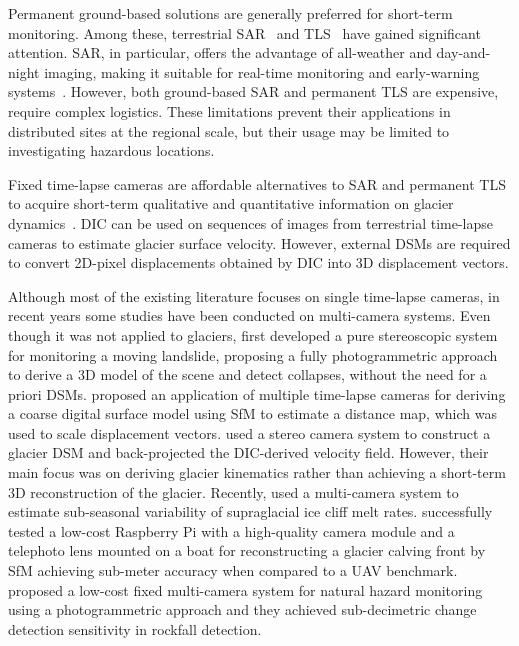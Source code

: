 Permanent ground-based solutions are generally preferred for short-term monitoring.
Among these, terrestrial SAR~\citep{Strozzi2020} and TLS~\citep{Hendrickx2022,Voordendag2023} have gained significant attention.
SAR, in particular, offers the advantage of all-weather and day-and-night imaging, making it suitable for real-time monitoring and early-warning systems~\citep{Dematteis2021, Noferini2009}.
However, both ground-based SAR and permanent TLS are expensive, require complex
logistics.
These limitations prevent their applications in distributed sites at the regional scale, but their usage may be limited to investigating hazardous locations.

Fixed time-lapse cameras are affordable alternatives to SAR and permanent TLS to acquire short-term qualitative and quantitative information on glacier dynamics~\citep{Giordan2016, James2016, Maas2006, Messerli2015}.
DIC can be used on sequences of images from terrestrial time-lapse cameras to estimate glacier surface velocity.
However, external DSMs are required to convert 2D-pixel displacements obtained by DIC into 3D displacement vectors.

Although most of the existing literature focuses on single time-lapse cameras, in recent
years some studies have been conducted on multi-camera systems.
Even though it was not applied to glaciers, \citet{roncella_landslide_2014} first
developed a pure stereoscopic system for monitoring a moving landslide, proposing a fully photogrammetric approach to derive a 3D model of the scene and detect collapses, without the need for a priori DSMs.
\citet{Schwalbe2017} proposed an application of multiple time-lapse cameras for deriving
a coarse digital surface model using SfM to estimate a distance
map, which was used to scale displacement vectors.
\citet{Marsy2020} used a stereo camera system to construct a glacier DSM and
back-projected the DIC-derived velocity field.
However, their main focus was on deriving glacier kinematics rather than achieving a
short-term 3D reconstruction of the glacier.
Recently, \citet{kneib_sub-seasonal_2022} used a multi-camera system to
estimate sub-seasonal variability of supraglacial ice cliff melt rates.
\citet{Taylor2023} successfully tested a low-cost Raspberry Pi with a high-quality camera
module and a telephoto lens mounted on a boat for reconstructing a glacier calving front
by SfM achieving sub-meter accuracy when compared to a UAV benchmark.
\citet{Blanch2023} proposed a low-cost fixed multi-camera system for natural hazard
monitoring using a photogrammetric approach and they achieved sub-decimetric change
detection sensitivity in rockfall detection.


